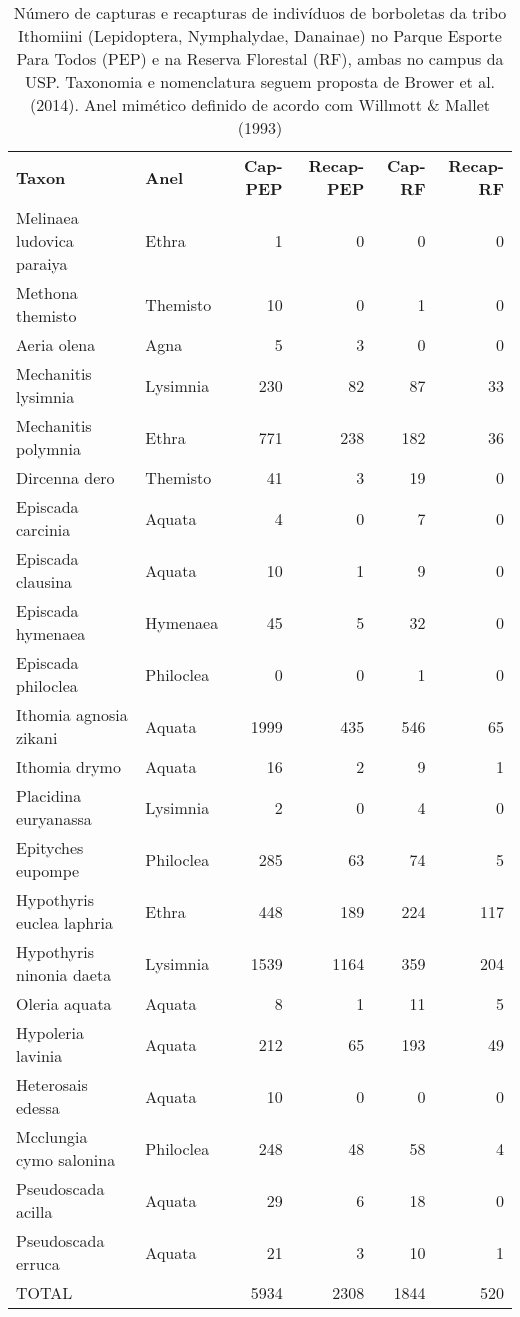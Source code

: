 \begin{table}
\caption{\label{tab:borb1} Número de capturas e recapturas de indivíduos 
de borboletas da tribo
Ithomiini (Lepidoptera, Nymphalydae, Danainae) no Parque
Esporte Para Todos (PEP) e na Reserva Florestal (RF), ambas no campus da
USP. Taxonomia e nomenclatura seguem proposta de Brower et
al. (2014). Anel mimético definido de acordo com Willmott \& Mallet
(1993)}
\begin{tabular}{llrrrr}
  \textbf{Taxon} & \textbf{Anel} & \textbf{Cap-PEP} & \textbf{Recap-PEP} & \textbf{Cap-RF} & \textbf{Recap-RF}\\
  Melinaea ludovica paraiya & Ethra & 1 & 0 & 0 & 0\\
  Methona themisto & Themisto & 10 & 0 & 1 & 0\\
  Aeria olena & Agna & 5 & 3 & 0 & 0\\
  Mechanitis lysimnia & Lysimnia & 230 & 82 & 87 & 33\\
  Mechanitis polymnia & Ethra & 771 & 238 & 182 & 36\\
  Dircenna dero & Themisto & 41 & 3 & 19 & 0\\
  Episcada carcinia & Aquata & 4 & 0 & 7 & 0\\
  Episcada clausina & Aquata & 10 & 1 & 9 & 0\\
  Episcada hymenaea & Hymenaea & 45 & 5 & 32 & 0\\
  Episcada philoclea & Philoclea & 0 & 0 & 1 & 0\\
  Ithomia agnosia zikani & Aquata & 1999 & 435 & 546 & 65\\
  Ithomia drymo & Aquata & 16 & 2 & 9 & 1\\
  Placidina euryanassa & Lysimnia & 2 & 0 & 4 & 0\\
  Epityches eupompe & Philoclea & 285 & 63 & 74 & 5\\
  Hypothyris euclea laphria & Ethra & 448 & 189 & 224 & 117\\
  Hypothyris ninonia daeta & Lysimnia & 1539 & 1164 & 359 & 204\\
  Oleria aquata & Aquata & 8 & 1 & 11 & 5\\
  Hypoleria lavinia & Aquata & 212 & 65 & 193 & 49\\
  Heterosais edessa & Aquata & 10 & 0 & 0 & 0\\
  Mcclungia cymo salonina & Philoclea & 248 & 48 & 58 & 4\\
  Pseudoscada acilla & Aquata & 29 & 6 & 18 & 0\\
  Pseudoscada erruca & Aquata & 21 & 3 & 10 & 1\\
  TOTAL & & 5934 & 2308 & 1844 & 520\\
\end{tabular} 
\end{table}